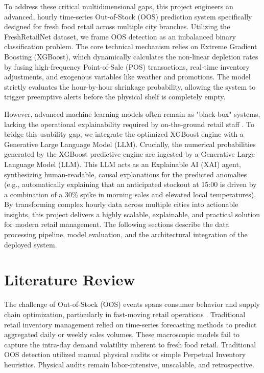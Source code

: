 \documentclass[11pt, a4paper]{article}
\begin{document}
To address these critical multidimensional gaps, this project engineers an advanced, hourly time-series Out-of-Stock (OOS) prediction system specifically designed for fresh food retail across multiple city branches. Utilizing the FreshRetailNet dataset, we frame OOS detection as an imbalanced binary classification problem. The core technical mechanism relies on Extreme Gradient Boosting (XGBoost), which dynamically calculates the non-linear depletion rates by fusing high-frequency Point-of-Sale (POS) transactions, real-time inventory adjustments, and exogenous variables like weather and promotions. The model strictly evaluates the hour-by-hour shrinkage probability, allowing the system to trigger preemptive alerts before the physical shelf is completely empty.

However, advanced machine learning models often remain as "black-box" systems, lacking the operational explainability required by on-the-ground retail staff \cite{papakiriakopoulos2009}. To bridge this usability gap, we integrate the optimized XGBoost engine with a Generative Large Language Model (LLM). Crucially, the numerical probabilities generated by the XGBoost predictive engine are ingested by a Generative Large Language Model (LLM). This LLM acts as an Explainable AI (XAI) agent, synthesizing human-readable, causal explanations for the predicted anomalies (e.g., automatically explaining that an anticipated stockout at 15:00 is driven by a combination of a 30\% spike in morning sales and elevated local temperatures). By transforming complex hourly data across multiple cities into actionable insights, this project delivers a highly scalable, explainable, and practical solution for modern retail management. The following sections describe the data processing pipeline, model evaluation, and the architectural integration of the deployed system.

\section{Literature Review}

The challenge of Out-of-Stock (OOS) events spans consumer behavior and supply chain optimization, particularly in fast-moving retail operations \cite{mou2018}. Traditional retail inventory management relied on time-series forecasting methods to predict aggregated daily or weekly sales volumes. These macroscopic models fail to capture the intra-day demand volatility inherent to fresh food retail. Traditional OOS detection utilized manual physical audits or simple Perpetual Inventory heuristics. Physical audits remain labor-intensive, unscalable, and retrospective.
\end{document}
